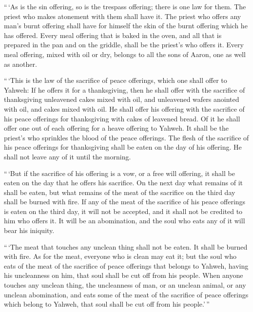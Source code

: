  ``\,`As is the sin offering, so is the trespass offering;
there is one law for them. The priest who makes atonement with them
shall have it.  The priest who offers any man's burnt
offering shall have for himself the skin of the burnt offering which he
has offered.  Every meal offering that is baked in the oven,
and all that is prepared in the pan and on the griddle, shall be the
priest's who offers it.  Every meal offering, mixed with
oil or dry, belongs to all the sons of Aaron, one as well as another.

 ``\,`This is the law of the sacrifice of peace offerings,
which one shall offer to Yahweh:  If he offers it for a
thanksgiving, then he shall offer with the sacrifice of thanksgiving
unleavened cakes mixed with oil, and unleavened wafers anointed with
oil, and cakes mixed with oil.  He shall offer his offering
with the sacrifice of his peace offerings for thanksgiving with cakes of
leavened bread.  Of it he shall offer one out of each
offering for a heave offering to Yahweh. It shall be the priest's who
sprinkles the blood of the peace offerings.  The flesh of
the sacrifice of his peace offerings for thanksgiving shall be eaten on
the day of his offering. He shall not leave any of it until the morning.

 ``\,`But if the sacrifice of his offering is a vow, or a
free will offering, it shall be eaten on the day that he offers his
sacrifice. On the next day what remains of it shall be eaten,
 but what remains of the meat of the sacrifice on the third
day shall be burned with fire.  If any of the meat of the
sacrifice of his peace offerings is eaten on the third day, it will not
be accepted, and it shall not be credited to him who offers it. It will
be an abomination, and the soul who eats any of it will bear his
iniquity.

 ``\,`The meat that touches any unclean thing shall not be
eaten. It shall be burned with fire. As for the meat, everyone who is
clean may eat it;  but the soul who eats of the meat of the
sacrifice of peace offerings that belongs to Yahweh, having his
uncleanness on him, that soul shall be cut off from his people.
 When anyone touches any unclean thing, the uncleanness of
man, or an unclean animal, or any unclean abomination, and eats some of
the meat of the sacrifice of peace offerings which belong to Yahweh,
that soul shall be cut off from his people.'\,''

